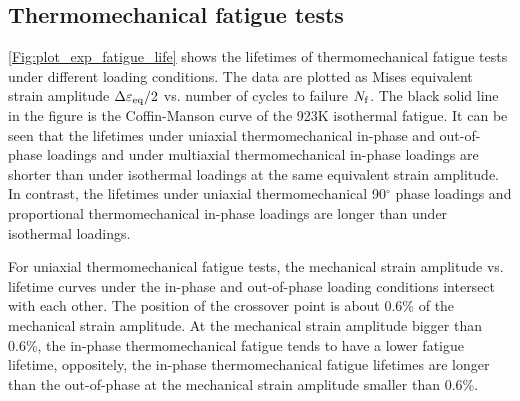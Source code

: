 \subsection{Thermomechanical fatigue tests}
\noindent
\ref{Fig:plot_exp_fatigue_life} shows the lifetimes of thermomechanical fatigue tests under different loading conditions. The data are plotted as Mises equivalent strain amplitude $\Delta\varepsilon_{\rm eq}/2$ vs. number of cycles to failure $N_{\rm f}$. The black solid line in the figure is the Coffin-Manson curve of the 923K isothermal fatigue. It can be seen that the lifetimes under uniaxial thermomechanical in-phase and out-of-phase loadings and under multiaxial thermomechanical in-phase loadings are shorter than under isothermal loadings at the same equivalent strain amplitude.
In contrast, the lifetimes under uniaxial thermomechanical 90$^\circ$ phase loadings and proportional thermomechanical in-phase loadings are longer than under isothermal loadings.

For uniaxial thermomechanical fatigue tests, the mechanical strain amplitude vs. lifetime curves under the in-phase and out-of-phase loading conditions intersect with each other. The position of the crossover point is about 0.6\% of the mechanical strain amplitude.
At the mechanical strain amplitude bigger than 0.6\%, the in-phase thermomechanical fatigue tends to have a lower fatigue lifetime, oppositely, the in-phase thermomechanical fatigue lifetimes are longer than the out-of-phase at the mechanical strain amplitude smaller than 0.6\%.



